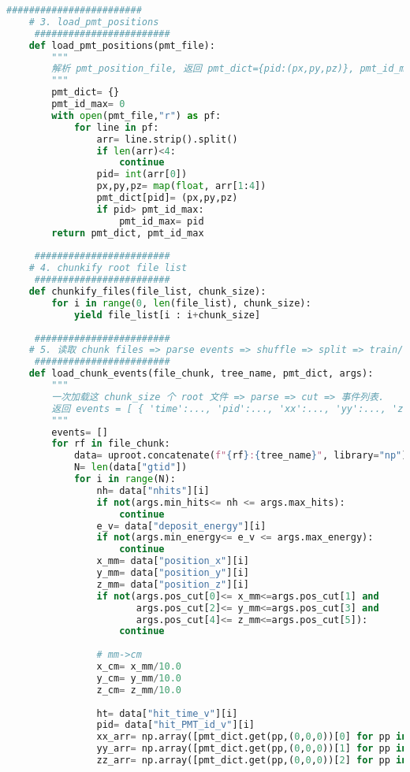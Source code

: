 \begin{lstlisting}[language=Python, caption={模型训练、验证与测试对比脚本 (train\_val\_test\_compare\_v1.py)}, label={lst:train_script}]
     ########################
    # 3. load_pmt_positions
     ########################
    def load_pmt_positions(pmt_file):
        """
        解析 pmt_position_file, 返回 pmt_dict={pid:(px,py,pz)}, pmt_id_max
        """
        pmt_dict= {}
        pmt_id_max= 0
        with open(pmt_file,"r") as pf:
            for line in pf:
                arr= line.strip().split()
                if len(arr)<4:
                    continue
                pid= int(arr[0])
                px,py,pz= map(float, arr[1:4])
                pmt_dict[pid]= (px,py,pz)
                if pid> pmt_id_max:
                    pmt_id_max= pid
        return pmt_dict, pmt_id_max
    
     ########################
    # 4. chunkify root file list
     ########################
    def chunkify_files(file_list, chunk_size):
        for i in range(0, len(file_list), chunk_size):
            yield file_list[i : i+chunk_size]
    
     ########################
    # 5. 读取 chunk files => parse events => shuffle => split => train/val/test
     ########################
    def load_chunk_events(file_chunk, tree_name, pmt_dict, args):
        """
        一次加载这 chunk_size 个 root 文件 => parse => cut => 事件列表.
        返回 events = [ { 'time':..., 'pid':..., 'xx':..., 'yy':..., 'zz':..., 'target_cm':..., 'sf_x_mm':..., 'energy':..., ... }, ... ]
        """
        events= []
        for rf in file_chunk:
            data= uproot.concatenate(f"{rf}:{tree_name}", library="np")
            N= len(data["gtid"])
            for i in range(N):
                nh= data["nhits"][i]
                if not(args.min_hits<= nh <= args.max_hits):
                    continue
                e_v= data["deposit_energy"][i]
                if not(args.min_energy<= e_v <= args.max_energy):
                    continue
                x_mm= data["position_x"][i]
                y_mm= data["position_y"][i]
                z_mm= data["position_z"][i]
                if not(args.pos_cut[0]<= x_mm<=args.pos_cut[1] and
                       args.pos_cut[2]<= y_mm<=args.pos_cut[3] and
                       args.pos_cut[4]<= z_mm<=args.pos_cut[5]):
                    continue
    
                # mm->cm
                x_cm= x_mm/10.0
                y_cm= y_mm/10.0
                z_cm= z_mm/10.0
    
                ht= data["hit_time_v"][i]
                pid= data["hit_PMT_id_v"][i]
                xx_arr= np.array([pmt_dict.get(pp,(0,0,0))[0] for pp in pid], dtype=np.float32)
                yy_arr= np.array([pmt_dict.get(pp,(0,0,0))[1] for pp in pid], dtype=np.float32)
                zz_arr= np.array([pmt_dict.get(pp,(0,0,0))[2] for pp in pid], dtype=np.float32)
    

\end{lstlisting}
